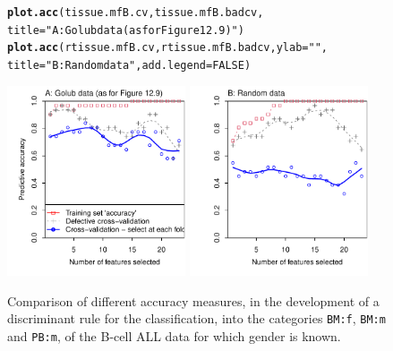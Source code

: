 \documentclass{article}\usepackage[]{graphicx}\usepackage[]{xcolor}
\makeatletter
\newcommand{\hlnum}[1]{\textcolor[rgb]{0.686,0.059,0.569}{#1}}%
\newcommand{\hlstr}[1]{\textcolor[rgb]{0.192,0.494,0.8}{#1}}%
\newcommand{\hlstd}[1]{\textcolor[rgb]{0.345,0.345,0.345}{#1}}%
\newcommand{\hlkwc}[1]{\textcolor[rgb]{0.333,0.667,0.333}{#1}}%
\newcommand{\hlkwd}[1]{\textcolor[rgb]{0.737,0.353,0.396}{\textbf{#1}}}%
\newenvironment{kframe}{%
 \def\at@end@of@kframe{}%
 \ifinner\ifhmode%
  \def\at@end@of@kframe{\end{minipage}}%
  \begin{minipage}{\columnwidth}%
 \fi\fi%
 \def\FrameCommand##1{\hskip\@totalleftmargin \hskip-\fboxsep
 \colorbox{shadecolor}{##1}\hskip-\fboxsep
     \hskip-\linewidth \hskip-\@totalleftmargin \hskip\columnwidth}%
 \MakeFramed {\advance\hsize-\width
   \@totalleftmargin\z@ \linewidth\hsize
   \@setminipage}}%
 {\par\unskip\endMakeFramed%
 \at@end@of@kframe}
\newenvironment{knitrout}{}{} %
\makeatother
\begin{document}
\begin{figure}[h]
\begin{knitrout}
\color{fgcolor}\begin{kframe}
\begin{alltt}
\hlkwd{plot.acc}\hlstd{(tissue.mfB.cv, tissue.mfB.badcv,}
         \hlkwc{title}\hlstd{=}\hlstr{"A: Golub data (as for Figure 12.9)"}\hlstd{)}
\hlkwd{plot.acc}\hlstd{(rtissue.mfB.cv, rtissue.mfB.badcv,} \hlkwc{ylab}\hlstd{=}\hlstr{""}\hlstd{,}
         \hlkwc{title}\hlstd{=}\hlstr{"B: Random data"}\hlstd{,} \hlkwc{add.legend}\hlstd{=}\hlnum{FALSE}\hlstd{)}
\end{alltt}
\end{kframe}

{\centering \includegraphics[width=0.47\textwidth]{figs/key-cv-bad-1} 
\includegraphics[width=0.47\textwidth]{figs/key-cv-bad-2} 

}


\end{knitrout}
\caption{Comparison of different accuracy measures, in the development
  of a discriminant rule for the classification, into the categories
  \texttt{BM:f}, \texttt{BM:m} and \texttt{PB:m}, of the B-cell ALL
  data for which gender is known.}\label{fig:cv-acc}

\end{figure}
\end{document}

